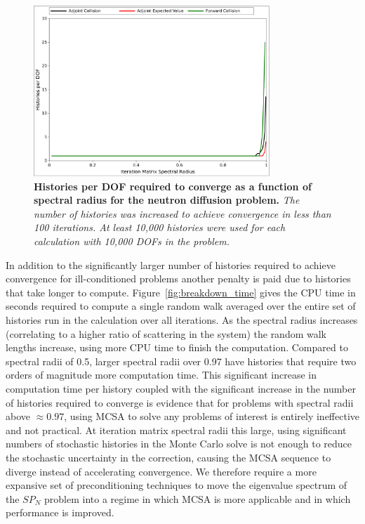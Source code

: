 \documentclass[letterpaper,12pt]{article}
\begin{document}
\begin{figure}[t!]
  \begin{center}
    \includegraphics[width=3.5in]{breakdown_histories.pdf}
  \end{center}
  \caption{\textbf{Histories per DOF required to converge as a
      function of spectral radius for the neutron diffusion problem.}
    \textit{The number of histories was increased to achieve
      convergence in less than 100 iterations. At least 10,000
      histories were used for each calculation with 10,000 DOFs in the
      problem.}}
  \label{fig:breakdown_histories}
\end{figure}

In addition to the significantly larger number of histories required
to achieve convergence for ill-conditioned problems another penalty is
paid due to histories that take longer to
compute. Figure~\ref{fig:breakdown_time} gives the CPU time in seconds
required to compute a single random walk averaged over the entire set
of histories run in the calculation over all iterations. As the
spectral radius increases (correlating to a higher ratio of scattering
in the system) the random walk lengths increase, using more CPU time
to finish the computation. Compared to spectral radii of 0.5, larger
spectral radii over 0.97 have histories that require two orders of
magnitude more computation time. This significant increase in
computation time per history coupled with the significant increase in
the number of histories required to converge is evidence that for
problems with spectral radii above $\approx 0.97$, using MCSA to solve
any problems of interest is entirely ineffective and not practical. At
iteration matrix spectral radii this large, using significant numbers
of stochastic histories in the Monte Carlo solve is not enough to
reduce the stochastic uncertainty in the correction, causing the MCSA
sequence to diverge instead of accelerating convergence. We therefore
require a more expansive set of preconditioning techniques to move the
eigenvalue spectrum of the $SP_N$ problem into a regime in which MCSA
is more applicable and in which performance is improved.
\end{document}
